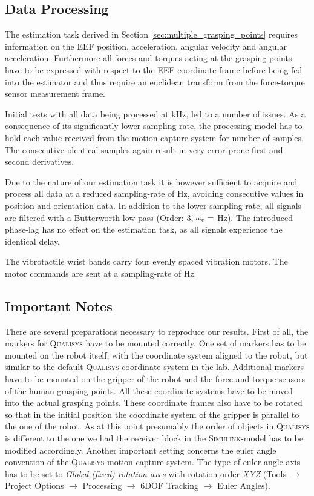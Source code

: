 \subsection{Data Processing}
The estimation task derived in Section \ref{sec:multiple_grasping_points} requires information on the EEF position, acceleration, angular velocity and angular acceleration. Furthermore all forces and torques acting at the grasping points have to be expressed with respect to the EEF coordinate frame before being fed into the estimator and thus require an euclidean transform from the force-torque sensor measurement frame.

Initial tests with all data being processed at \unit[1]{kHz}, led to a number of issues. As a consequence of its significantly lower sampling-rate, the processing model has to hold each value received from the motion-capture system for number of samples.  The consecutive identical samples again result in very error prone first
and second derivatives.

Due to the nature of our estimation task it is however sufficient to acquire and process all data at a reduced sampling-rate of \unit[100]{Hz}, avoiding consecutive values in position and orientation data. In addition to the lower sampling-rate, all signals are filtered with a Butterworth low-pass (Order: 3, $\omega_{\mathrm{c}} =$ \unit[30]{Hz}). The introduced phase-lag has no effect on the estimation task, as all signals experience the identical delay.

The vibrotactile wrist bands carry four evenly spaced vibration motors. The motor commands are sent at a sampling-rate of \unit[100]{Hz}.

\subsection{Important Notes}
There are several preparations necessary to reproduce our results. First of all, the markers for \textsc{Qualisys} have to be mounted correctly. One set of markers has to be mounted on the robot itself, with the coordinate system aligned to the robot, but similar to the default \textsc{Qualisys} coordinate system in the lab. Additional markers have to be mounted on the gripper of the robot and the force and torque sensors of the human grasping points. All these coordinate systems have to be moved into the actual grasping points. These coordinate frames also have to be rotated so that in the initial position the coordinate system of the gripper is parallel to the one of the robot. As at this point presumably the order of objects in \textsc{Qualisys} is different to the one we had the receiver block in the \textsc{Simulink}-model has to be modified accordingly. Another important setting concerns the euler angle convention of the \textsc{Qualisys} motion-capture system. The type of euler angle axis has to be set to \textit{Global (fixed) rotation axes} with rotation order \textit{XYZ} (Tools $\rightarrow$ Project Options $\rightarrow$ Processing $\rightarrow$ 6DOF Tracking $\rightarrow$ Euler Angles). 


